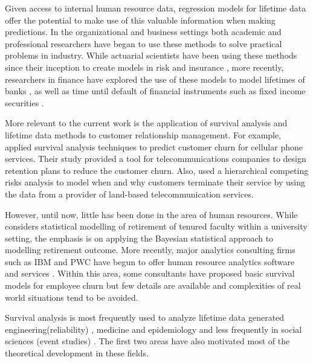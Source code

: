 \documentclass[12pt,letterpaper]{article}
\begin{document}
Given access to internal human resource data, regression models for lifetime data offer the potential to make use of this valuable information when making predictions. In the organizational and business settings both academic and professional researchers have began to use these methods to solve practical problems in industry. While actuarial scientists have been using these methods since their inception to create models in risk and insurance \citep{brockett2008}, more recently, researchers in finance have explored the use of these models to model lifetimes of banks \citep{Lane1986}, as well as time until default of financial instruments such as fixed income securities \citep{leclere2005}.

More relevant to the current work is the application of survival analysis and lifetime data methods to customer relationship management.  For example, \citet{lu2002} applied survival analysis techniques to predict customer churn for cellular phone services. Their study provided a tool for telecommunications companies to design retention plans to reduce the customer churn.  Also, \citet{braun2011} used a hierarchical competing risks analysis to model when and why customers terminate their service by using the data from a provider of land-based telecommunication services.

However, until now, little has been done in the area of human resources.   While \citet{berger1993} considers statistical modelling of retirement of tenured faculty within a university setting, the emphasis is on applying the Bayesian statistical approach to modelling retirement outcome.  More recently, major analytics consulting firms such as IBM and PWC have begun to offer human resource analytics software and services \citep{IBM,PWC}.  Within this area, some consultants have proposed basic survival models for employee churn \citep{briggs2015} but few details are available and complexities of real world situations tend to be avoided.


Survival analysis is most frequently used to analyze lifetime data generated engineering(reliability) \citep{lawless2011,meeker2014,holt2011}, medicine and epidemiology \citep{kalbfleisch2011} and less frequently in social sciences (event studies) \citep{allison2010,long2006}.  The first two areas have also motivated most of the theoretical development in these fields.
\end{document}
